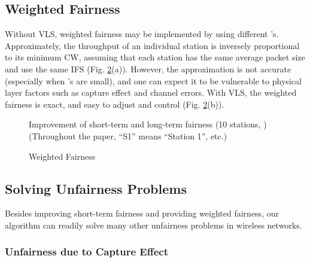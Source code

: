 \documentclass[letterpaper, 10 pt, conference]{ieeeconf}
\begin{document}
\subsection{Weighted Fairness}

Without VLS, weighted fairness may be implemented by using different
's. Approximately, the throughput of an individual station is inversely
proportional to its minimum CW, assuming that each station has the same average packet
size and use the same IFS (Fig. \ref{fig:Weighted-Fairness}(a)). However, the approximation
is not accurate (especially when 's are small), and one can expect
it to be vulnerable to physical layer factors such as capture effect
and channel errors. With VLS, the weighted fairness is exact, and easy
to adjust and control (Fig. \ref{fig:Weighted-Fairness}(b)).

\begin{figure}


\caption{\label{fig:short-term}Improvement of short-term and long-term fairness
(10 stations, ) (Throughout the paper, ``S1'' means ``Station 1'', etc.)}
\end{figure}


\begin{figure}


\caption{\label{fig:Weighted-Fairness}Weighted Fairness}
\end{figure}



\subsection{Solving Unfairness Problems}

Besides improving short-term fairness and providing weighted fairness,
our algorithm can readily solve many other unfairness problems in
wireless networks.


\subsubsection{Unfairness due to Capture Effect}
\end{document}

